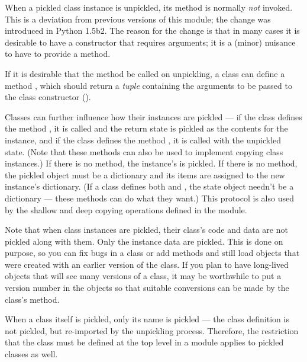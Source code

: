 When a pickled class instance is unpickled, its  method
is normally \emph{not} invoked.   This is a deviation
from previous versions of this module; the change was introduced in
Python 1.5b2.  The reason for the change is that in many cases it is
desirable to have a constructor that requires arguments; it is a
(minor) nuisance to have to provide a  method.

If it is desirable that the  method be called on
unpickling, a class can define a method ,
which should return a {\em tuple} containing the arguments to be
passed to the class constructor ().

Classes can further influence how their instances are pickled --- if the class
defines the method , it is called and the return
state is pickled as the contents for the instance, and if the class
defines the method , it is called with the
unpickled state.  (Note that these methods can also be used to
implement copying class instances.)  If there is no
 method, the instance's  is
pickled.  If there is no  method, the pickled
object must be a dictionary and its items are assigned to the new
instance's dictionary.  (If a class defines both 
and , the state object needn't be a dictionary
--- these methods can do what they want.)  This protocol is also used
by the shallow and deep copying operations defined in the 
module.

Note that when class instances are pickled, their class's code and
data are not pickled along with them.  Only the instance data are
pickled.  This is done on purpose, so you can fix bugs in a class or
add methods and still load objects that were created with an earlier
version of the class.  If you plan to have long-lived objects that
will see many versions of a class, it may be worthwhile to put a version
number in the objects so that suitable conversions can be made by the
class's  method.

When a class itself is pickled, only its name is pickled --- the class
definition is not pickled, but re-imported by the unpickling process.
Therefore, the restriction that the class must be defined at the top
level in a module applies to pickled classes as well.

